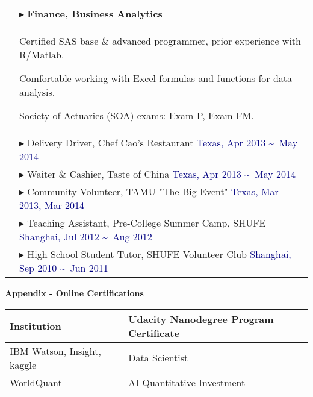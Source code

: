 \documentclass[$if(fontsize)$$fontsize$,$endif$$if(lang)$$babel-lang$,$endif$$if(papersize)$$papersize$paper,$endif$$for(classoption)$$classoption$$sep$,$endfor$]{$documentclass$}
\renewenvironment{itemize}{
  \begin{list}{}{
    \setlength{\leftmargin}{1em}  %
  }
}{
  \end{list}
}
\begin{document}
\begin{tabular}{>{\centering}p{2.5cm}|p{16.5cm}}
    & \vspace{-3mm}
    \(\blacktriangleright\) \textbf{Finance, Business Analytics}\\
    & \vspace{-2mm}
      \begin{itemize}
        \item[\textbullet] Certified SAS base \& advanced programmer, prior experience with R/Matlab.
        \item[\textbullet] Comfortable working with Excel formulas and functions for data analysis.
        \item[\textbullet] Society of Actuaries (SOA) exams: Exam P, Exam FM.
      \vspace{-4mm}
      \end{itemize}\\

    \midrule
    \multirow{2}{*}{\small\textbf{PART-TIME}}
    & \(\blacktriangleright\) Delivery Driver, Chef Cao's Restaurant \hfill \textcolor{Navy}{Texas, Apr 2013 \textasciitilde\ May 2014}\\
    \rule{0pt}{4mm}
    & \(\blacktriangleright\) Waiter \& Cashier, Taste of China \hfill \textcolor{Navy}{Texas, Apr 2013 \textasciitilde\ May 2014}\\

    \midrule
    \multirow{3}{*}{\parbox{2.5cm}{\centering\small\textbf{VOLUNTEER WORK}}}
    & \(\blacktriangleright\) Community Volunteer, \small TAMU \normalsize "The Big Event" \hfill \textcolor{Navy}{Texas, Mar 2013, Mar 2014}\\
    \rule{0pt}{4mm}
    & \(\blacktriangleright\) Teaching Assistant, Pre-College Summer Camp, \small SHUFE \normalsize \hfill \textcolor{Navy}{Shanghai, Jul 2012 \textasciitilde\ Aug 2012}\\
    \rule{0pt}{4mm}
    & \(\blacktriangleright\) High School Student Tutor, \small SHUFE \normalsize Volunteer Club \hfill \textcolor{Navy}{Shanghai, Sep 2010 \textasciitilde\ Jun 2011}\\

    \midrule
\end{tabular}

\newpage

\begin{center} \large{\textbf{Appendix - Online Certifications}} \end{center}

\small

\begin{longtable}[c]{|p{4.5cm}|p{14.5cm}|}  %
  \toprule
  \textbf{Institution} & \textbf{Udacity Nanodegree Program Certificate} \\
  \midrule
  \endfirsthead
  IBM Watson, Insight, kaggle & Data Scientist              \\
  WorldQuant                  & AI Quantitative Investment  \\
  \bottomrule
\end{longtable}
\end{document}
